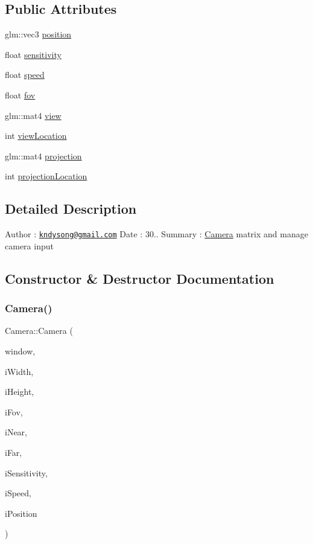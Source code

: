 \subsection*{Public Attributes}
\begin{DoxyCompactItemize}
\item 
glm\+::vec3 \mbox{\hyperlink{class_camera_a04b5db2c530d8630660e8cfb93a4b3b5}{position}}
\item 
float \mbox{\hyperlink{class_camera_a5431c8caefafb42a667ca4c801bef07f}{sensitivity}}
\item 
float \mbox{\hyperlink{class_camera_a2960f533df18fe6d7d574c316c6d217a}{speed}}
\item 
float \mbox{\hyperlink{class_camera_aff7393c9cfbccd7e369091f00008da93}{fov}}
\item 
glm\+::mat4 \mbox{\hyperlink{class_camera_add93fedd6b9a6a6e2c784aeda624de83}{view}}
\item 
int \mbox{\hyperlink{class_camera_a0640e08466574276525f91826c0691c6}{view\+Location}}
\item 
glm\+::mat4 \mbox{\hyperlink{class_camera_a43555a0ae83f9ec696ee257e5fd48cf2}{projection}}
\item 
int \mbox{\hyperlink{class_camera_ac36bf5e482e8a82b118e0bcf8f617a5c}{projection\+Location}}
\end{DoxyCompactItemize}


\subsection{Detailed Description}
Author \+: \href{mailto:kndysong@gmail.com}{\tt kndysong@gmail.\+com} Date \+: 30.. Summary \+: \mbox{\hyperlink{class_camera}{Camera}} matrix and manage camera input 

\subsection{Constructor \& Destructor Documentation}
\mbox{\label{class_camera_a1c40f8c6fe27e69dab22d7b6a6f18b25}} 
\subsubsection{\texorpdfstring{Camera()}{Camera()}}
{\footnotesize\ttfamily Camera\+::\+Camera (\begin{DoxyParamCaption}\item[{G\+L\+F\+Wwindow $\ast$}]{window,  }\item[{float}]{i\+Width,  }\item[{float}]{i\+Height,  }\item[{float}]{i\+Fov,  }\item[{float}]{i\+Near,  }\item[{float}]{i\+Far,  }\item[{float}]{i\+Sensitivity,  }\item[{float}]{i\+Speed,  }\item[{glm\+::vec3}]{i\+Position }\end{DoxyParamCaption})}



